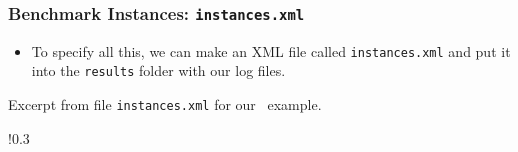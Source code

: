 %
%
\begin{frame}
\frametitle{Benchmark Instances: \texttt{instances.xml}}%
%
\begin{itemize}%
\item To specify all this, we can make an XML file called \texttt{instances.xml} and put it into the \texttt{results} folder with our log files.%
\end{itemize}%
%
\begin{locateBox}{0.025}{0.235}
\begin{listingblock}[0.95\paperwidth]{Excerpt from file \texttt{instances.xml} for our \maxSat\ example.}
\centering
\begin{scaledBox}{!}{0.3\paperheight}
\parbox{1.75\paperwidth}{%

}%
\end{scaledBox}
\end{listingblock}
\end{locateBox}
%
\end{frame}
%
%
%
